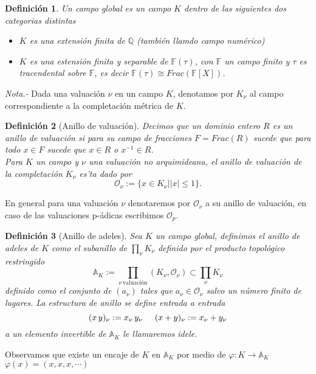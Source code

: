 \documentclass[letterpaper]{report}
\newtheorem{def.}{Definici\'on}[chapter]
\newcommand{\rac}{\ensuremath{ \mathbb Q }}
\newcommand{\Oan}{\ensuremath{\mathcal{O}}}
\newcommand{\Ad}{\ensuremath{\mathbb{A}}}
\begin{document}
\begin{def.}
Un campo global es un campo $K$ dentro de las siguientes dos categorias distintas
\begin{itemize}
	\item $K$ es una extensión finita de $\rac$ (también llamdo campo numérico)
	\item $K$ es una estensión finita y separable de $\mathbb{F}(\tau)$, con $\mathbb{F}$ un campo finito y $\tau$ es tracendental sobre $\mathbb{F}$, es decir $\mathbb{F}(\tau)\cong Frac(\mathbb{F}[X])$.
\end{itemize}
\end{def.}

\noindent\textit{Nota.-} Dada una valuación $\nu$ en un campo $K$, denotamos por $K_{\nu}$ al campo correspondiente a la completación métrica de $K$.

\begin{def.}[Anillo de valuación]
Decimos que un dominio entero $R$ es un anillo de valuación si para su campo de fracciones $F=Frac(R)$ sucede que para todo $x\in F$ sucede que $x\in R$ o $x^{-1}\in R$.\\

Para $K$ un campo y $\nu$ una valuación no arquimideana, el anillo de valuación de la completación $K_{\nu}$ es'ta dado por
\begin{equation}
	\Oan_{\nu}:=\lbrace x\in K_{\nu}\mid \vert x\vert\leq 1\rbrace.
\end{equation}
\end{def.}

En general para una valuación $\nu$ denotaremos por $\Oan_{\nu}$ a su anillo de valuación, en caso de las valuaciones p-ádicas escribimos $\Oan_{p}$.

\begin{def.}[Anillo de adeles]
Sea $K$ un campo global, definimos el anillo de adeles de $K$ como el subanillo de $\prod_{\nu} K_{\nu}$ definido por el producto topológico restringido
\begin{equation}
	\Ad_{K}:=\prod_{\nu\,\text{valuación}}(K_{\nu},\Oan_{\nu})\subset\prod_{\nu} K_{\nu}
\end{equation}
\noindent definido como el conjunto de $(a_\nu)$ tales que $a_{\nu}\in\Oan_{\nu}$ salvo un número finito de lugares. La estructura de anillo se define entrada a entrada
$$(x\,y)_{\nu}:=x_{\nu}\,y_{\nu}\hspace{0.5cm}(x+y)_{\nu}:=x_{\nu}+y_{\nu}$$
\noindent a un elemento invertible de $\Ad_{K}$ le llamaremos idele.
\end{def.}
Observamos que existe un encaje de $K$ en $\Ad_{K}$ por medio de $\varphi:K\rightarrow\Ad_{K}$ $\varphi(x)=(x,x,x,\cdots)$
\end{document}
